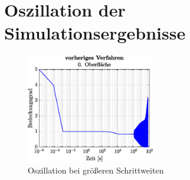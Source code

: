 \documentclass{listhesis}
\begin{document}
\section{Oszillation der Simulationsergebnisse} \label{section:oscillation}

\begin{figure}[]
\centering
\includegraphics[width=0.5\textwidth]{./include/figure_5.0/old/CovFacet0.eps} 
\caption{Oszillation bei größeren Schrittweiten}
\label{fig:oscillation}
\end{figure}
\end{document}
